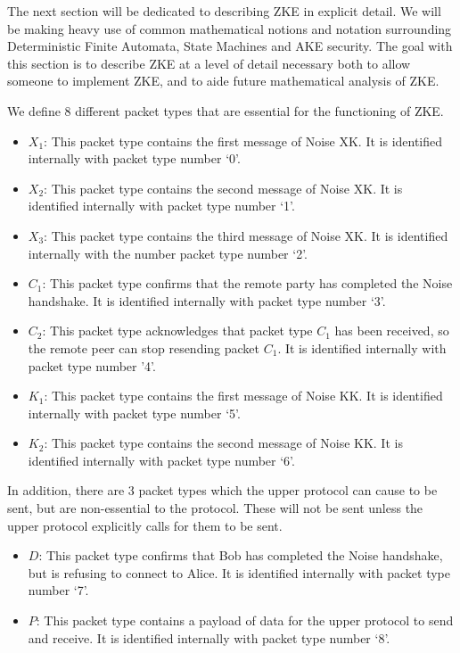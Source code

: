 \documentclass{article}
\begin{document}
The next section will be dedicated to describing ZKE in explicit detail. We will be making heavy use of common mathematical notions and notation surrounding Deterministic Finite Automata, State Machines and AKE security. The goal with this section is to describe ZKE at a level of detail necessary both to allow someone to implement ZKE, and to aide future mathematical analysis of ZKE.

\begin{definition}
	We define 8 different packet types that are essential for the functioning of ZKE.
	\begin{itemize}
		\item $X_1$: This packet type contains the first message of Noise XK. It is identified internally with packet type number `0'.
		\item $X_2$: This packet type contains the second message of Noise XK. It is identified internally with packet type number `1'.
		\item $X_3$: This packet type contains the third message of Noise XK. It is identified internally with the number packet type number `2'.
		\item $C_1$: This packet type confirms that the remote party has completed the Noise handshake. It is identified internally with packet type number `3'.
		\item $C_2$: This packet type acknowledges that packet type $C_1$ has been received, so the remote peer can stop resending packet $C_1$. It is identified internally with packet type number '4'.
		\item $K_1$: This packet type contains the first message of Noise KK. It is identified internally with packet type number `5'.
		\item $K_2$: This packet type contains the second message of Noise KK. It is identified internally with packet type number `6'.
	\end{itemize}
	In addition, there are 3 packet types which the upper protocol can cause to be sent, but are non-essential to the protocol. These will not be sent unless the upper protocol explicitly calls for them to be sent.
	\begin{itemize}
		\item $D$: This packet type confirms that Bob has completed the Noise handshake, but is refusing to connect to Alice. It is identified internally with packet type number `7'.
		\item $P$: This packet type contains a payload of data for the upper protocol to send and receive. It is identified internally with packet type number `8'.
	\end{itemize}
\end{definition}
\end{document}
